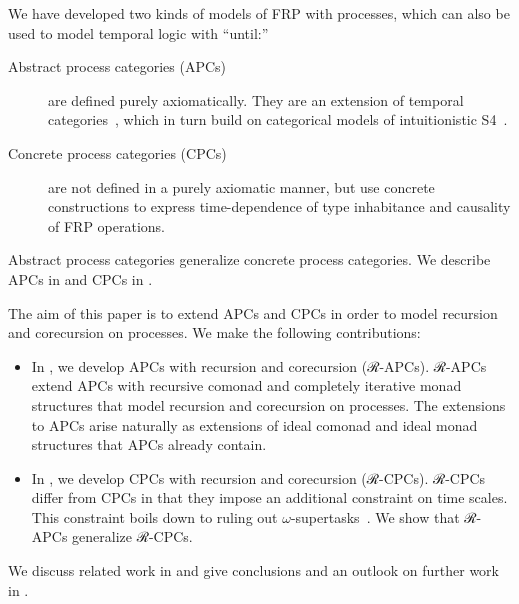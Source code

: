 \documentclass[copyright,creativecommons]{eptcs}
\begin{document}
We have developed two kinds of models of FRP with processes, which can also be
used to model temporal logic with “until:”
\begin{description}

\item[Abstract process categories (APCs)~\cite{jeltsch:plpv-2014}]

are defined purely axiomatically. They are an extension of temporal
categories~\cite{jeltsch:entcs-286}, which in turn build on categorical models
of intuitionistic S4~\cite{kobayashi:tcs-175-1,bierman:sl-65-3}.

\item[Concrete process categories (CPCs)~\cite{jeltsch:plpv-2013}]

are not defined in a purely axiomatic manner, but use concrete constructions to
express time-dependence of type inhabitance and causality of FRP operations.

\end{description}
Abstract process categories generalize concrete process categories. We describe
APCs in  and CPCs in
.

The aim of this paper is to extend APCs and CPCs in order to model recursion and
corecursion on processes. We make the following contributions:
\begin{itemize}

\item

In , we develop APCs with
recursion and corecursion (ℛ-APCs). ℛ-APCs extend APCs with recursive comonad
and completely iterative monad structures that model recursion and corecursion
on processes. The extensions to APCs arise naturally as extensions of ideal
comonad and ideal monad structures that APCs already contain.

\item

In , we develop CPCs with
recursion and corecursion (ℛ-CPCs). ℛ-CPCs differ from CPCs in that they impose
an additional constraint on time scales. This constraint boils down to ruling
out $ω$-supertasks~\cite{laraudogoitia:supertasks}. We show that ℛ-APCs
generalize ℛ-CPCs.

\end{itemize}

We discuss related work in  and give conclusions and an
outlook on further work in .
\end{document}
